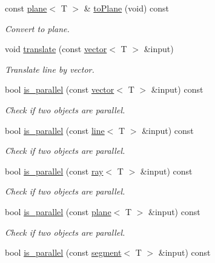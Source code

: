 \begin{DoxyCompactItemize}
\mbox{\label{classddd_1_1line_a6727586814331ef291c60149a0c88c5a}} 
const \hyperlink{classddd_1_1plane}{plane}$<$ T $>$ \& \hyperlink{classddd_1_1line_a6727586814331ef291c60149a0c88c5a}{to\+Plane} (void) const
\begin{DoxyCompactList}\small\item\em Convert to plane. \end{DoxyCompactList}\item 
void \hyperlink{classddd_1_1line_a46e5ed85d7fe38fc3d4d4755b3f23568}{translate} (const \hyperlink{classddd_1_1vector}{vector}$<$ T $>$ \&input)
\begin{DoxyCompactList}\small\item\em Translate line by vector. \end{DoxyCompactList}\item 
bool \hyperlink{classddd_1_1line_a9a299f9e7241572177826969d96fefe6}{is\+\_\+parallel} (const \hyperlink{classddd_1_1vector}{vector}$<$ T $>$ \&input) const
\begin{DoxyCompactList}\small\item\em Check if two objects are parallel. \end{DoxyCompactList}\item 
bool \hyperlink{classddd_1_1line_aba281798b6743c8bbab01df3613325ac}{is\+\_\+parallel} (const \hyperlink{classddd_1_1line}{line}$<$ T $>$ \&input) const
\begin{DoxyCompactList}\small\item\em Check if two objects are parallel. \end{DoxyCompactList}\item 
bool \hyperlink{classddd_1_1line_a57ddc03fe8add135eac64eeb88c3c5b8}{is\+\_\+parallel} (const \hyperlink{classddd_1_1ray}{ray}$<$ T $>$ \&input) const
\begin{DoxyCompactList}\small\item\em Check if two objects are parallel. \end{DoxyCompactList}\item 
bool \hyperlink{classddd_1_1line_affec7d381a8b3f3ce9786412893da61e}{is\+\_\+parallel} (const \hyperlink{classddd_1_1plane}{plane}$<$ T $>$ \&input) const
\begin{DoxyCompactList}\small\item\em Check if two objects are parallel. \end{DoxyCompactList}\item 
bool \hyperlink{classddd_1_1line_a2226c26de0134fda0458ade612626c10}{is\+\_\+parallel} (const \hyperlink{classddd_1_1segment}{segment}$<$ T $>$ \&input) const

\end{DoxyCompactItemize}
